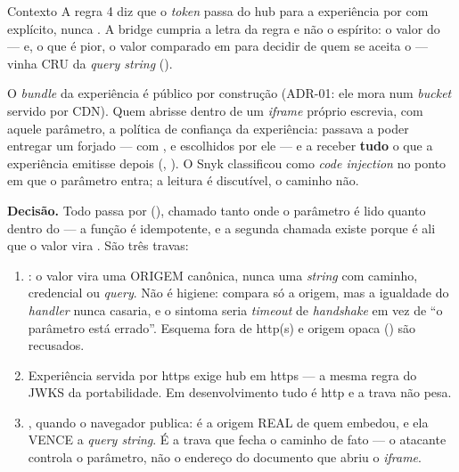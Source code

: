 \begin{especificacao}{Contexto}
A regra 4 diz que o \emph{token} passa do hub para a experiência por
 com  explícito, nunca . A bridge
cumpria a letra da regra e não o espírito: o valor do  ---
e, o que é pior, o valor comparado em  para decidir
de quem se aceita o  --- vinha CRU da \emph{query string}
().

O \emph{bundle} da experiência é público por construção (ADR-01: ele mora num
\emph{bucket} servido por CDN). Quem abrisse
 dentro de
um \emph{iframe} próprio escrevia, com aquele parâmetro, a política de confiança
da experiência: passava a poder entregar um  forjado --- com
,  e  escolhidos por ele --- e a receber
\textbf{tudo} o que a experiência emitisse depois (,
). O Snyk classificou como \emph{code injection} no ponto em que
o parâmetro entra; a leitura é discutível, o caminho não.
\end{especificacao}

\textbf{Decisão.} Todo  passa por 
(), chamado tanto onde o parâmetro é lido quanto
dentro do  --- a função é idempotente, e a segunda chamada
existe porque é ali que o valor vira . São três travas:

\begin{enumerate}
  \item {}: o valor vira uma ORIGEM canônica, nunca uma
    \emph{string} com caminho, credencial ou \emph{query}. Não é higiene:
     compara só a origem, mas a igualdade do \emph{handler}
    nunca casaria, e o sintoma seria \emph{timeout} de \emph{handshake} em vez
    de ``o parâmetro está errado''. Esquema fora de http(s) e origem opaca
    () são recusados.
  \item Experiência servida por https exige hub em https --- a mesma regra do
    JWKS da portabilidade. Em desenvolvimento tudo é http e a trava não pesa.
  \item {}, quando o navegador publica: é a origem
    REAL de quem embedou, e ela VENCE a \emph{query string}. É a trava que
    fecha o caminho de fato --- o atacante controla o parâmetro, não o endereço
    do documento que abriu o \emph{iframe}.
\end{enumerate}

